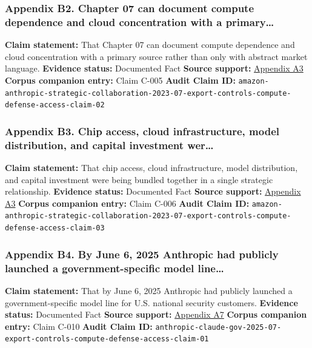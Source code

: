 \documentclass[
  american,
  11pt,
  letterpaper,
]{article}
\begin{document}
\subsubsection{Appendix B2. Chapter 07 can document compute dependence
and cloud concentration with a
primary\ldots{}}\label{appendix-b2-chapter-07-can-document-compute-dependence-and-cloud-concentration-with-a-primary}

\textbf{Claim statement:} That Chapter 07 can document compute
dependence and cloud concentration with a primary source rather than
only with abstract market language. \textbf{Evidence status:} Documented
Fact \textbf{Source support:}
\hyperref[appendix-a3-amazon-and-anthropic-announce-strategic-collaboration-to-advance-generative-ai]{Appendix
A3} \textbf{Corpus companion entry:} Claim C-005 \textbf{Audit Claim
ID:}
\texttt{amazon-anthropic-strategic-collaboration-2023-07-export-controls-compute-defense-access-claim-02}

\subsubsection{Appendix B3. Chip access, cloud infrastructure, model
distribution, and capital investment
wer\ldots{}}\label{appendix-b3-chip-access-cloud-infrastructure-model-distribution-and-capital-investment-wer}

\textbf{Claim statement:} That chip access, cloud infrastructure, model
distribution, and capital investment were being bundled together in a
single strategic relationship. \textbf{Evidence status:} Documented Fact
\textbf{Source support:}
\hyperref[appendix-a3-amazon-and-anthropic-announce-strategic-collaboration-to-advance-generative-ai]{Appendix
A3} \textbf{Corpus companion entry:} Claim C-006 \textbf{Audit Claim
ID:}
\texttt{amazon-anthropic-strategic-collaboration-2023-07-export-controls-compute-defense-access-claim-03}

\subsubsection{Appendix B4. By June 6, 2025 Anthropic had publicly
launched a government-specific model
line\ldots{}}\label{appendix-b4-by-june-6-2025-anthropic-had-publicly-launched-a-government-specific-model-line}

\textbf{Claim statement:} That by June 6, 2025 Anthropic had publicly
launched a government-specific model line for U.S. national security
customers. \textbf{Evidence status:} Documented Fact \textbf{Source
support:}
\hyperref[appendix-a7-claude-gov-models-for-u-s-national-security-customers]{Appendix
A7} \textbf{Corpus companion entry:} Claim C-010 \textbf{Audit Claim
ID:}
\texttt{anthropic-claude-gov-2025-07-export-controls-compute-defense-access-claim-01}
\end{document}
